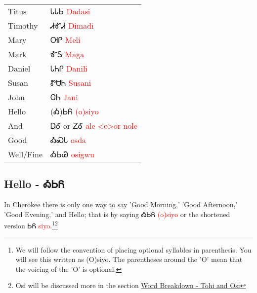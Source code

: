 \begin{minipage}{\linewidth}
\begin{tabular}{p{3cm} p{11cm}}
Titus & ᏓᏓᏏ 
 \newline \textcolor{red}{Dadasi}\\
Timothy & ᏗᎹᏗ 
 \newline \textcolor{red}{Dimadi}\\
Mary & ᎺᎵ 
 \newline \textcolor{red}{Meli}\\
Mark & ᎹᎦ 
 \newline \textcolor{red}{Maga}\\
Daniel & ᏓᏂᎵ 
 \newline \textcolor{red}{Danili}\\
Susan & ᏑᏌᏂ 
 \newline \textcolor{red}{Susani}\\
John & ᏣᏂ 
 \newline \textcolor{red}{Jani}\\
Hello & (Ꭳ)ᏏᏲ 
 \newline \textcolor{red}{(o)siyo}\\
And & ᎠᎴ 
  or ᏃᎴ 
 \newline \textcolor{red}{ale <e>or nole}\\
Good & ᎣᏍᏓ 
 \newline \textcolor{red}{osda}\\
Well/Fine & ᎣᏏᏊ 
 \newline \textcolor{red}{osigwu}\\
\end{tabular}
\end{minipage}

\subsection{Hello - ᎣᏏᏲ}
In Cherokee there is only one way to say 'Good Morning,' 'Good Afternoon,' 'Good Evening,' and Hello; that is by saying ᎣᏏᏲ \textcolor{red}{(o)siyo} or the shortened version ᏏᏲ \textcolor{red}{siyo}.\footnote{We will follow the convention of placing optional syllables in parenthesis.  You will see this written as (O)siyo.  The parentheses around the 'O' mean that the voicing of the 'O' is optional.}\footnote{Osi will be discussed more in the section \hyperref[sec:wordBreakdownTohiOsi]{Word Breakdown - Tohi and Osi}}
